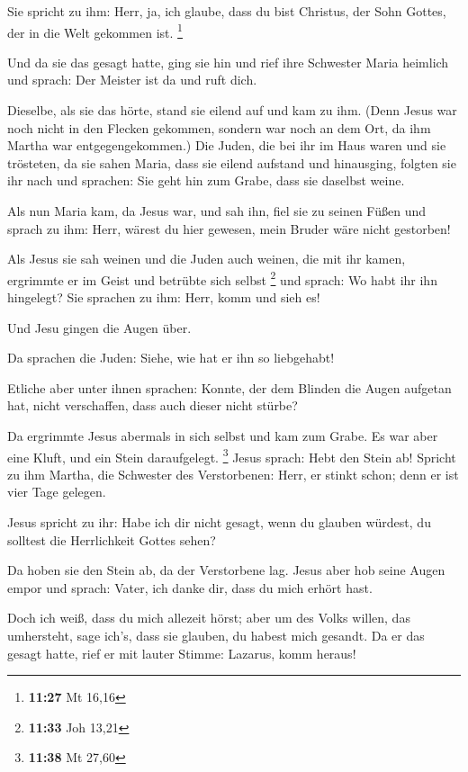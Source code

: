  Sie spricht zu ihm: Herr, ja, ich glaube, dass du bist
Christus, der Sohn Gottes, der in die Welt gekommen ist. \footnote{\textbf{11:27}
  Mt 16,16}

 Und da sie das gesagt hatte, ging sie hin und rief ihre
Schwester Maria heimlich und sprach: Der Meister ist da und ruft dich.

 Dieselbe, als sie das hörte, stand sie eilend auf und
kam zu ihm.  (Denn Jesus war noch nicht in den Flecken
gekommen, sondern war noch an dem Ort, da ihm Martha war
entgegengekommen.)  Die Juden, die bei ihr im Haus waren
und sie trösteten, da sie sahen Maria, dass sie eilend aufstand und
hinausging, folgten sie ihr nach und sprachen: Sie geht hin zum Grabe,
dass sie daselbst weine.

 Als nun Maria kam, da Jesus war, und sah ihn, fiel sie
zu seinen Füßen und sprach zu ihm: Herr, wärest du hier gewesen, mein
Bruder wäre nicht gestorben!

 Als Jesus sie sah weinen und die Juden auch weinen, die
mit ihr kamen, ergrimmte er im Geist und betrübte sich selbst
\footnote{\textbf{11:33} Joh 13,21}  und sprach: Wo habt
ihr ihn hingelegt? Sie sprachen zu ihm: Herr, komm und sieh es!

 Und Jesu gingen die Augen über.

 Da sprachen die Juden: Siehe, wie hat er ihn so
liebgehabt!

 Etliche aber unter ihnen sprachen: Konnte, der dem
Blinden die Augen aufgetan hat, nicht verschaffen, dass auch dieser
nicht stürbe?

 Da ergrimmte Jesus abermals in sich selbst und kam zum
Grabe. Es war aber eine Kluft, und ein Stein daraufgelegt. \footnote{\textbf{11:38}
  Mt 27,60}  Jesus sprach: Hebt den Stein ab! Spricht zu
ihm Martha, die Schwester des Verstorbenen: Herr, er stinkt schon; denn
er ist vier Tage gelegen.

 Jesus spricht zu ihr: Habe ich dir nicht gesagt, wenn du
glauben würdest, du solltest die Herrlichkeit Gottes sehen?

 Da hoben sie den Stein ab, da der Verstorbene lag. Jesus
aber hob seine Augen empor und sprach: Vater, ich danke dir, dass du
mich erhört hast.

 Doch ich weiß, dass du mich allezeit hörst; aber um des
Volks willen, das umhersteht, sage ich's, dass sie glauben, du habest
mich gesandt.  Da er das gesagt hatte, rief er mit lauter
Stimme: Lazarus, komm heraus!

